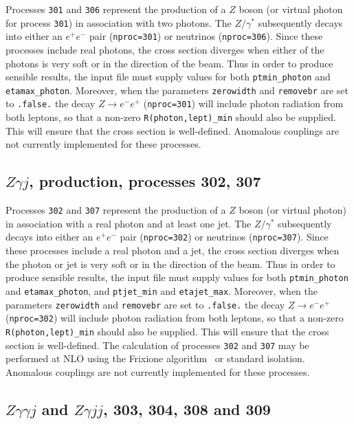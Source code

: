 \documentclass{article}
\begin{document}
{{{{{{Processes {\tt{301}} and {\tt{306}} represent the production of a $Z$ boson 
(or virtual photon for process {\tt 301}) in association with two photons.   The $Z/\gamma^*$ subsequently decays into 
either an $e^+ e^-$ pair ({\tt nproc=301}) or neutrinos ({\tt nproc=306}).
Since these processes include real photons, the cross section diverges
when either of the photons is very soft or in the direction of the beam.
Thus in order to produce sensible results, the input file must supply values for both
{\tt ptmin\_photon} and {\tt etamax\_photon}. Moreover, when the parameters {\tt zerowidth}
and {\tt removebr} are set to {\tt .false.} the decay $Z \to e^- e^+$ ({\tt nproc=301})
will include photon radiation from both leptons, so that a non-zero {\tt R(photon,lept)\_min}
should also be supplied. This will ensure that the cross section is well-defined.
Anomalous couplings are not currently implemented for these processes. 

\subsection{$Z\gamma j$, production, processes 302, 307}
\label{subsec:zgammajet}
Processes {\tt 302} and {\tt 307} represent the production of a $Z$ boson (or virtual photon)
in association with a real photon and at least one jet. 
The $Z/\gamma^*$ subsequently decays into 
either an $e^+ e^-$ pair ({\tt nproc=302}) or neutrinos ({\tt nproc=307}).
Since these processes include a real photon and a jet, the cross section diverges
when the photon or jet is very soft or in the direction of the beam.
Thus in order to produce sensible results, the input file must supply values for both
{\tt ptmin\_photon} and {\tt etamax\_photon}, and {\tt ptjet\_min} and {\tt etajet\_max}.
 Moreover, when the parameters {\tt zerowidth}
and {\tt removebr} are set to {\tt .false.} the decay $Z \to e^- e^+$ ({\tt nproc=302})
will include photon radiation from both leptons, so that a non-zero {\tt R(photon,lept)\_min}
should also be supplied. This will ensure that the cross section is well-defined.
The calculation of processes {\tt 302} and {\tt 307} may be performed
at NLO using the Frixione algorithm~\cite{Frixione:1998jh} or standard isolation. 
Anomalous couplings are not currently implemented for these processes. 


\subsection{$Z\gamma\gamma j$ and $Z\gamma j j $, 303, 304, 308 and 309}

}}}}}}
\end{document}
